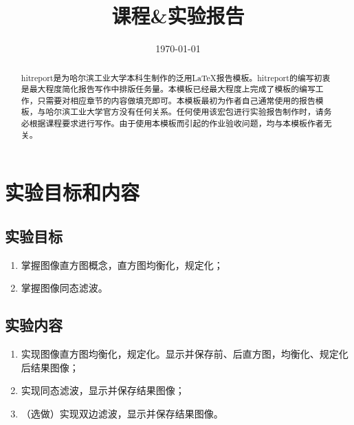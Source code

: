 \documentclass{hitreport}
\title{课程\&实验报告} %
\date{\today} %
\begin{document}

\maketitle
\begin{abstract}
hitreport是为哈尔滨工业大学本科生制作的泛用\LaTeX 报告模板。hitreport的编写初衷是最大程度简化报告写作中排版任务量。本模板已经最大程度上完成了模板的编写工作，只需要对相应章节的内容做填充即可。本模板最初为作者自己通常使用的报告模板，与哈尔滨工业大学官方没有任何关系。任何使用该宏包进行实验报告制作时，请务必根据课程要求进行写作。由于使用本模板而引起的作业验收问题，均与本模板作者无关。

\end{abstract}

\tableofcontents
\newpage



\section{实验目标和内容}

\subsection{实验目标}
\begin{enumerate}
\item 掌握图像直方图概念，直方图均衡化，规定化；
\item 掌握图像同态滤波。
\end{enumerate}

\subsection{实验内容}
\begin{enumerate}
\item 实现图像直方图均衡化，规定化。显示并保存前、后直方图，均衡化、规定化后结果图像；
\item 实现同态滤波，显示并保存结果图像；
\item （选做）实现双边滤波，显示并保存结果图像。
\end{enumerate}
\end{document}
